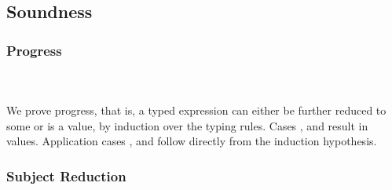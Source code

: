 \subsection{Soundness}

\subsubsection{Progress}\hfill\\\\
We prove progress, that is, a typed expression    \Data{:}  can either be further reduced to some  or  is a value, by induction over the typing rules. 
\FProgress
Cases ,  and  result in values. Application cases ,  and  follow directly from the induction hypothesis. 
\subsubsection{Subject Reduction}\hfill\\\\
\FSubjectReduction
